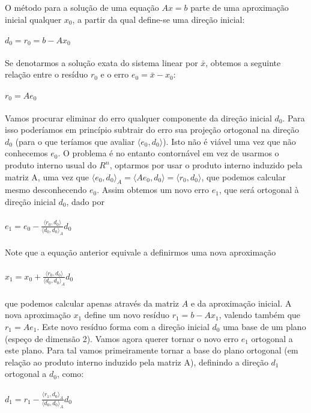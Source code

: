 \documentclass[a4paper,11pt]{article}
\begin{document}
O método para a solução de uma equação $Ax=b$ parte de uma aproximação inicial qualquer
$x_{0}$, a partir da qual define-se uma direção inicial:
\\~\\
$d_{0}=r_{0}=b-Ax_{0}$
\\~\\
Se denotarmos a solução exata do sistema linear por $\bar x$, obtemos a seguinte relação entre o resíduo $r_{0}$ e o erro $e_{0} = \bar x - x_{0}$:
\\~\\
$r_{0} = Ae_{0}$
\\~\\
Vamos procurar eliminar do erro qualquer componente da direção inicial $d_{0}$.
Para isso poderíamos em princípio subtrair do erro sua projeção ortogonal na direção $d_{0}$ (para o que teríamos que avaliar $\langle e_{0} , d_{0} \rangle$). Isto não é viável uma vez que não conhecemos $e_{0}$. O problema é no entanto contornável em vez de usarmos o produto interno usual do $R^{n}$, optarmos por usar o produto interno induzido pela matriz A, uma vez que $\langle e_{0} , d_{0} \rangle_{A} = \langle Ae_{0} , d_{0} \rangle = \langle r_{0} , d_{0} \rangle$, que podemos calcular mesmo desconhecendo $e_{0}$. Assim obtemos um novo erro $e_{1}$, que será ortogonal à direção inicial $d_{0}$, dado por
\\~\\
$e_{1} = e_{0} - \frac{\langle r_{0} , d_{0} \rangle}{\langle d_{0} , d_{0} \rangle_{A}} d_{0}$
\\~\\
Note que a equação anterior equivale a definirmos uma nova aproximação
\\~\\
$x_{1} = x_{0} + \frac{\langle r_{0} , d_{0} \rangle}{\langle d_{0} , d_{0} \rangle_{A}} d_{0}$
\\~\\
que podemos calcular apenas através da matriz $A$ e da aproximação inicial. A nova aproximação $x_{1}$ define um novo resíduo $r_{1} = b - Ax_{1}$, valendo também que $r_{1} = Ae_{1}$. Este novo resíduo forma com a direção inicial $d_{0}$ uma base de um plano (espeço de dimensão 2). Vamos agora querer tornar o novo erro $e_{1}$ ortogonal a este plano. Para tal vamos primeiramente tornar a base do plano ortogonal (em relação ao produto interno induzido pela matriz A), definindo a direção $d_{1}$ ortogonal a $d_{0}$, como:
\\~\\
$d_{1} = r_{1} - \frac{\langle r_{1} , d_{0} \rangle_{A}}{\langle d_{0} , d_{0} \rangle_{A}} d_{0}$
\end{document}
